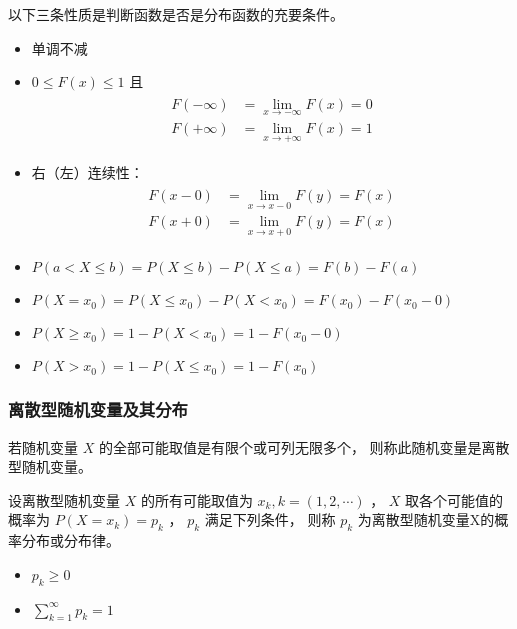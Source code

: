  以下三条性质是判断函数是否是分布函数的充要条件。
\begin{itemize}[leftmargin=\subparitemindent]
    \item 单调不减
    \item  $ 0 \leqslant F(x) \leqslant 1 $ 且 \begin{align}
        \begin{split}
            F(-\infty) &= \lim_{x \rightarrow -\infty} F(x) = 0 \\
            F(+\infty) &= \lim_{x \rightarrow +\infty} F(x) = 1
        \end{split}
    \end{align}
    \item 右（左）连续性：\begin{align}
        \begin{split}
            F(x - 0) &= \lim_{x \rightarrow x - 0} F(y) = F(x) \\
            F(x + 0) &= \lim_{x \rightarrow x + 0} F(y) = F(x)
        \end{split}
    \end{align}
\end{itemize}

\begin{itemize}[leftmargin=\subparitemindent]
    \item  $ P(a < X \leqslant b) = P(X \leqslant b) - P(X \leqslant a) = F(b) - F(a) $ 
    \item  $ P(X = x_0) = P(X \leqslant x_0) - P(X < x_0) = F(x_0) - F(x_0 - 0) $ 
    \item  $ P(X \geqslant x_0) = 1 - P(X < x_0) = 1 - F(x_0 - 0) $ 
    \item  $ P(X > x_0) = 1 - P(X \leqslant x_0) = 1 - F(x_0) $ 
\end{itemize}

\subsubsection{离散型随机变量及其分布}

 若随机变量 $ X $ 的全部可能取值是有限个或可列无限多个，
则称此随机变量是离散型随机变量。

 设离散型随机变量 $ X $ 的所有可能取值为 $ x_k,k=(1,2,\cdots) $ ，
$ X $ 取各个可能值的概率为 $ P(X = x_k) = p_k $ ， $ p_k $ 满足下列条件，
则称 $ p_k $ 为离散型随机变量X的概率分布或分布律。
\begin{itemize}[leftmargin=\paritemindent]
    \item  $ p_k \geqslant 0 $ 
    \item  $ \sum_{k=1}^\infty p_k = 1 $ 
\end{itemize}

